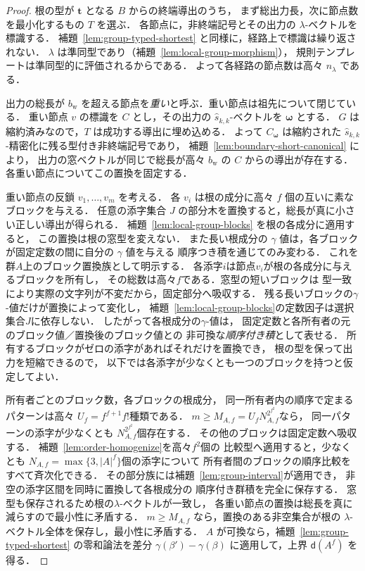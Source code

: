 \begin{proof}
根の型が $\mathbf t$ となる $B$ からの終端導出のうち，
まず総出力長，次に節点数を最小化するもの $T$ を選ぶ．
各節点に，非終端記号とその出力の $\lambda$-ベクトルを標識する．
補題~\ref{lem:group-typed-shortest} と同様に，経路上で標識は繰り返されない．
$\lambda$ は準同型であり（補題~\ref{lem:local-group-morphism}），
規則テンプレートは準同型的に評価されるからである．
よって各経路の節点数は高々 $n_\lambda$ である．

出力の総長が $b_{\mathrm w}$ を超える節点を\emph{重い}と呼ぶ．重い節点は祖先について閉じている．
重い節点 $v$ の標識を $C$ とし，その出力の $\widehat{s}_{k,k}$-ベクトルを $\boldsymbol\omega$ とする．
$G$ は縮約済みなので，$T$ は成功する導出に埋め込める．
よって $C_{\boldsymbol\omega}$ は縮約された $\widehat{s}_{k,k}$-精密化に残る型付き非終端記号であり，
補題~\ref{lem:boundary-short-canonical} により，
出力の窓ベクトルが同じで総長が高々 $b_{\mathrm w}$ の $C$ からの導出が存在する．
各重い節点についてこの置換を固定する．

重い節点の反鎖 $v_1,\ldots,v_m$ を考える．
各 $v_i$ は根の成分に高々 $f$ 個の互いに素なブロックを与える．
任意の添字集合 $J$ の部分木を置換すると，総長が真に小さい正しい導出が得られる．
補題~\ref{lem:local-group-blocks} を根の各成分に適用すると，
この置換は根の窓型を変えない．
また長い根成分の $\gamma$ 値は，各ブロックが固定定数の間に自分の $\gamma$ 値を与える
順序つき積を通じてのみ変わる．
これを群$A$上のブロック置換族として明示する．
各添字$i$は節点$v_i$が根の各成分に与えるブロックを所有し，
その総数は高々$f$である．窓型の短いブロックは
型一致により実際の文字列が不変だから，固定部分へ吸収する．
残る長いブロックの$\gamma$-値だけが置換によって変化し，
補題~\ref{lem:local-group-blocks}の定数因子は選択集合$J$に依存しない．
したがって各根成分の$\gamma$-値は，
固定定数と各所有者の元のブロック値／置換後のブロック値との
非可換な\emph{順序付き積}として表せる．
所有するブロックがゼロの添字があればそれだけを置換でき，
根の型を保って出力を短縮できるので，
以下では各添字が少なくとも一つのブロックを持つと仮定してよい．

所有者ごとのブロック数，各ブロックの根成分，
同一所有者内の順序で定まるパターンは高々
$U_f=f^{f+1}f!$種類である．
$m\ge M_{A,f}=U_fN_{A,f}^{2^{f^2}}$なら，
同一パターンの添字が少なくとも
$N_{A,f}^{2^{f^2}}$個存在する．
その他のブロックは固定定数へ吸収する．
補題~\ref{lem:order-homogenize}を高々$f^2$個の
比較型へ適用すると，少なくとも
$N_{A,f}=\max\{3,|A|^f\}$個の添字について
所有者間のブロックの順序比較をすべて斉次化できる．
その部分族には補題~\ref{lem:group-interval}が適用でき，
非空の添字区間を同時に置換して各根成分の
順序付き群積を完全に保存する．
窓型も保存されるため根の$\lambda$-ベクトルが一致し，
各重い節点の置換は総長を真に減らすので最小性に矛盾する．
$m\ge M_{A,f}$ なら，置換のある非空集合が根の $\lambda$-ベクトル全体を保存し，最小性に矛盾する．
$A$ が可換なら，補題~\ref{lem:group-typed-shortest} の零和論法を差分
$\gamma(\beta')-\gamma(\beta)$ に適用して，上界 $\mathsf d(A^f)$ を得る．


\end{proof}
